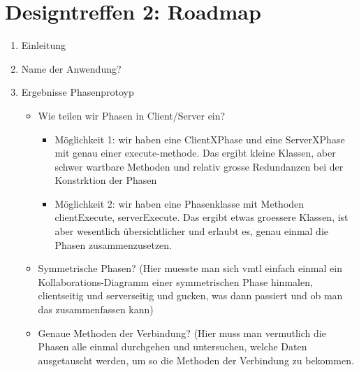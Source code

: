 \documentclass{article}
\begin{document}
\section{Designtreffen 2: Roadmap}
\begin{enumerate}
\item Einleitung

\item Name der Anwendung?

\item Ergebnisse Phasenprotoyp
    \begin{itemize}
        \item Wie teilen wir Phasen in Client/Server ein? 
            \begin{itemize}
                \item M\"oglichkeit 1: wir haben eine ClientXPhase und eine
                      ServerXPhase mit genau einer execute-methode. Das
                      ergibt kleine Klassen, aber schwer wartbare Methoden
                      und relativ grosse Redundanzen bei der Konstrktion
                      der Phasen
                \item M\"oglichkeit 2: wir haben eine Phasenklasse mit 
                      Methoden clientExecute, serverExecute. Das ergibt
                      etwas groessere Klassen, ist aber wesentlich
                      \"ubersichtlicher und erlaubt es, genau einmal
                      die Phasen zusammenzusetzen.
            \end{itemize}

        \item Symmetrische Phasen? (Hier muesste man sich vmtl einfach
              einmal ein Kollaborations-Diagramm einer symmetrischen
              Phase hinmalen, clientseitig und serverseitig und gucken,
              was dann passiert und ob man das zusammenfassen kann)

        \item Genaue Methoden der Verbindung? (Hier muss man vermutlich
              die Phasen alle einmal durchgehen und untersuchen, welche
              Daten ausgetauscht werden, um so die Methoden der Verbindung
              zu bekommen.


\end{itemize}
\end{enumerate}
\end{document}

